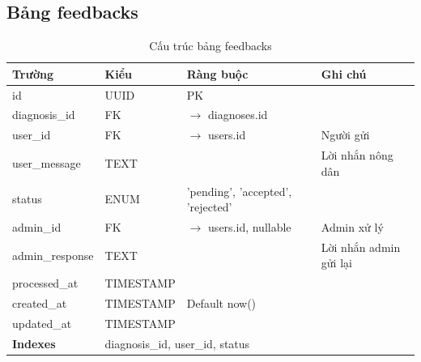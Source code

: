 \documentclass[12pt,a4paper]{article}
\begin{document}
\subsection{Bảng feedbacks}
\clearpage
\begin{table}[htbp]
    \centering
    \small
    \renewcommand{\arraystretch}{0.95}
    \setlength{\tabcolsep}{5pt}
    \caption{Cấu trúc bảng feedbacks}
    \begin{tabular}{|l|l|l|p{5.5cm}|}
        \hline
        \rowcolor{headerblue}
        \textbf{Trường} & \textbf{Kiểu} & \textbf{Ràng buộc}                & \textbf{Ghi chú}       \\
        \hline
        id              & UUID          & PK                                &                        \\
        \hline
        diagnosis\_id   & FK            & $\rightarrow$ diagnoses.id        &                        \\
        \hline
        user\_id        & FK            & $\rightarrow$ users.id            & Người gửi              \\
        \hline
        user\_message   & TEXT          &                                   & Lời nhắn nông dân      \\
        \hline
        status          & ENUM          & 'pending', 'accepted', 'rejected' &                        \\
        \hline
        admin\_id       & FK            & $\rightarrow$ users.id, nullable  & Admin xử lý            \\
        \hline
        admin\_response & TEXT          &                                   & Lời nhắn admin gửi lại \\
        \hline
        processed\_at   & TIMESTAMP     &                                   &                        \\
        \hline
        created\_at     & TIMESTAMP     & Default now()                     &                        \\
        \hline
        updated\_at     & TIMESTAMP     &                                   &                        \\
        \hline
        \rowcolor{headerblue}
        \textbf{Indexes} & \multicolumn{3}{l|}{diagnosis\_id, user\_id, status}                      \\
        \hline
    \end{tabular}
\end{table}
\end{document}
